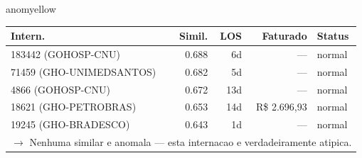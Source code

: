 \documentclass[a4paper,10pt]{article}
\begin{document}
\begin{anomalycard}[Internacao 163931 | GHO-PETROBRAS | MODERADO (z=2.64)]{anomyellow}
\begin{tabular}{l r r r l}\toprule\textbf{Intern.} & \textbf{Simil.} & \textbf{LOS} & \textbf{Faturado} & \textbf{Status} \\\midrule
183442 (GOHOSP-CNU) & 0.688 & 6d & --- & \textcolor{jcubeblue}{normal} \\
71459 (GHO-UNIMEDSANTOS) & 0.682 & 5d & --- & \textcolor{jcubeblue}{normal} \\
4866 (GOHOSP-CNU) & 0.672 & 13d & --- & \textcolor{jcubeblue}{normal} \\
18621 (GHO-PETROBRAS) & 0.653 & 14d & R\$ 2.696,93 & \textcolor{jcubeblue}{normal} \\
19245 (GHO-BRADESCO) & 0.643 & 1d & --- & \textcolor{jcubeblue}{normal} \\
\multicolumn{5}{l}{\textcolor{jcubeblue}{\small $\rightarrow$ Nenhuma similar e anomala --- esta internacao e verdadeiramente atipica.}} \\
\bottomrule\end{tabular}


\end{anomalycard}

\newpage
\end{document}
